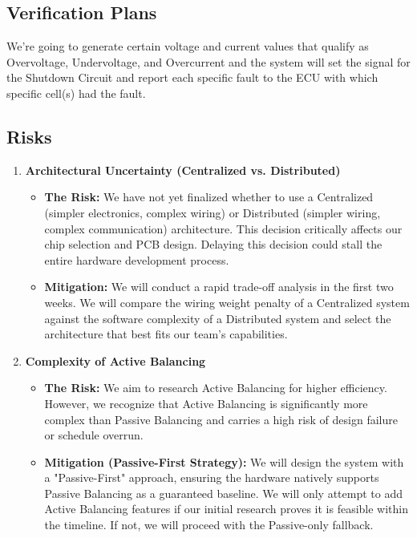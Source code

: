 \subsection{Verification Plans}
We’re going to generate certain voltage and current values that qualify as Overvoltage, Undervoltage, and Overcurrent and the system will set the signal for the Shutdown Circuit and report each specific fault to the ECU with which specific cell(s) had the fault.

\subsection{Risks}
\begin{enumerate}
	\item \textbf{Architectural Uncertainty (Centralized vs. Distributed)}\begin{itemize}
		\item \textbf{The Risk:} We have not yet finalized whether to use a Centralized (simpler electronics, complex wiring) or Distributed (simpler wiring, complex communication) architecture. This decision critically affects our chip selection and PCB design. Delaying this decision could stall the entire hardware development process.
		\item \textbf{Mitigation:} We will conduct a rapid trade-off analysis in the first two weeks. We will compare the wiring weight penalty of a Centralized system against the software complexity of a Distributed system and select the architecture that best fits our team's capabilities.
	\end{itemize}
	
	\item \textbf{Complexity of Active Balancing} \begin{itemize}
		\item \textbf{The Risk:} We aim to research Active Balancing for higher efficiency. However, we recognize that Active Balancing is significantly more complex than Passive Balancing and carries a high risk of design failure or schedule overrun.
		\item \textbf{Mitigation (Passive-First Strategy):} We will design the system with a "Passive-First" approach, ensuring the hardware natively supports Passive Balancing as a guaranteed baseline. We will only attempt to add Active Balancing features if our initial research proves it is feasible within the timeline. If not, we will proceed with the Passive-only fallback.
	\end{itemize}
	

\end{enumerate}
